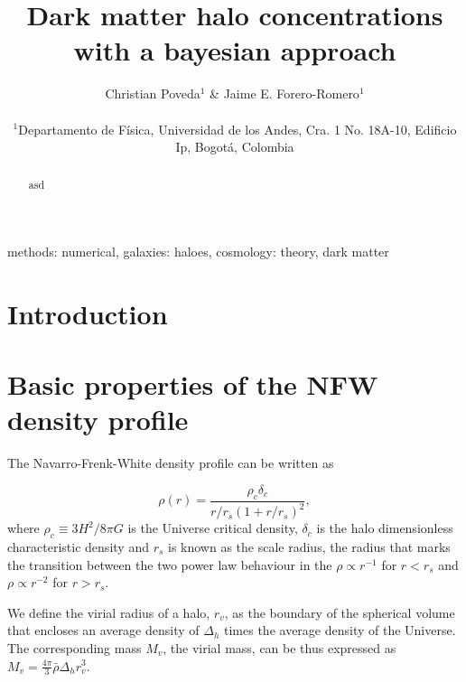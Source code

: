 \documentclass[useAMS,usenatbib]{mn2e}
\begin{document}
\title[Bayesian halo concentrations]{Dark matter halo
  concentrations with a bayesian approach}
\author[Poveda \& Forero-Romero]{
\parbox[t]{\textwidth}{\raggedright
  Christian Poveda$^{1}$ \&
  Jaime E. Forero-Romero$^{1}$
}
\vspace*{6pt}\\
$^{1}$Departamento de F\'{i}sica, Universidad de los Andes, Cra. 1
No. 18A-10, Edificio Ip, Bogot\'a, Colombia\\
}
\maketitle

\begin{abstract}
asd
\end{abstract}
\begin{keywords}
methods: numerical, galaxies: haloes, cosmology: theory, dark
matter
\end{keywords}


\section{Introduction}
\label{sec:introduction}


\citep{NFW}


\section{Basic properties of the NFW density profile}
\label{sec:basics}

The Navarro-Frenk-White density profile can be written as

\begin{equation}
\rho(r) = \frac{\rho_c\delta_c}{r/r_s(1+r/r_s)^2}, 
\end{equation}
%
where $\rho_c\equiv 3H^2/8\pi G$ is the Universe critical density,
$\delta_c$ is the halo dimensionless characteristic density and $r_s$
is known as the scale radius, the radius that marks the transition
between the two power law behaviour in the $\rho\propto r^{-1}$ for
$r<r_s$ and $\rho\propto r^{-2}$ for  $r>r_s$.  

We define the virial radius of a halo, $r_v$, as the boundary of the
spherical volume that encloses an average density of $\Delta_h$ times
the average density of the Universe. The corresponding mass $M_{v}$,
the virial mass, can be thus expressed as $M_{v} =
\frac{4\pi}{3}\bar{\rho}\Delta_h r_v^3$. 
\end{document}
